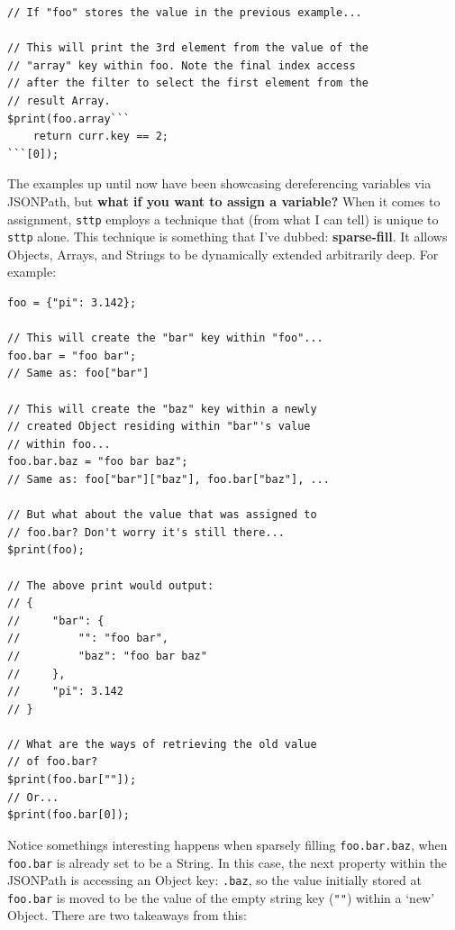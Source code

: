 \documentclass[]{full}
\theoremstyle{definition}
\begin{document}
\begin{verbatim}
// If "foo" stores the value in the previous example...

// This will print the 3rd element from the value of the
// "array" key within foo. Note the final index access 
// after the filter to select the first element from the
// result Array.
$print(foo.array```
    return curr.key == 2;
```[0]);
\end{verbatim}

The examples up until now have been showcasing dereferencing variables via JSONPath, but \textbf{what if you want to assign a variable?} When it comes to assignment, \verb|sttp| employs a technique that (from what I can tell) is unique to \verb|sttp| alone. This technique is something that I've dubbed: \textbf{sparse-fill}. It allows Objects, Arrays, and Strings to be dynamically extended arbitrarily deep. For example:

\begin{verbatim}
foo = {"pi": 3.142};

// This will create the "bar" key within "foo"...
foo.bar = "foo bar";
// Same as: foo["bar"]

// This will create the "baz" key within a newly
// created Object residing within "bar"'s value
// within foo...
foo.bar.baz = "foo bar baz";
// Same as: foo["bar"]["baz"], foo.bar["baz"], ...

// But what about the value that was assigned to
// foo.bar? Don't worry it's still there...
$print(foo);

// The above print would output:
// {
//     "bar": {
//         "": "foo bar",
//         "baz": "foo bar baz"
//     },
//     "pi": 3.142
// }

// What are the ways of retrieving the old value
// of foo.bar?
$print(foo.bar[""]);
// Or...
$print(foo.bar[0]);
\end{verbatim}

Notice somethings interesting happens when sparsely filling \verb|foo.bar.baz|, when \verb|foo.bar| is already set to be a String. In this case, the next property within the JSONPath is accessing an Object key: \verb|.baz|, so the value initially stored at \verb|foo.bar| is moved to be the value of the empty string key (\verb|""|) within a `new' Object. There are two takeaways from this:
\end{document}
